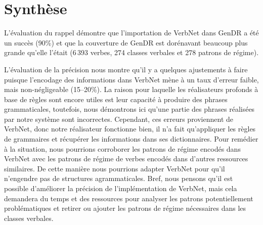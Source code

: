 \section{Synthèse}

L'évaluation du rappel démontre que l'importation de VerbNet dans GenDR a été un succès (90\%) et que la couverture de GenDR est dorénavant beaucoup plus grande qu'elle l'était (6\,393 verbes, 274 classes verbales et 278 patrons de régime).

L'évaluation de la précision nous montre qu'il y a quelques ajustements à faire puisque l'encodage des informations dans VerbNet mène à un taux d'erreur faible, mais non-négligeable (15--20\%). La raison pour laquelle les réalisateurs profonds à base de règles sont encore utiles est leur capacité à produire des phrases grammaticales, toutefois, nous démontrons ici qu'une partie des phrases réalisées par notre système sont incorrectes. Cependant, ces erreurs proviennent de VerbNet, donc notre réalisateur fonctionne bien, il n'a fait qu'appliquer les règles de grammaires et récupérer les informations dans ses dictionnaires. Pour remédier à la situation, nous pourrions corroborer les patrons de régime encodés dans VerbNet avec les patrons de régime de verbes encodés dans d'autres ressources similaires. De cette manière nous pourrions adapter VerbNet pour qu'il n'engendre pas de structures agrammaticales. Bref, nous pensons qu'il est possible d'améliorer la précision de l'implémentation de VerbNet, mais cela demandera du temps et des ressources pour analyser les patrons potentiellement problématiques et retirer ou ajouter les patrons de régime nécessaires dans les classes verbales.

